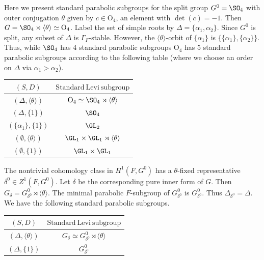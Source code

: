 \documentclass[11pt,letterpaper]{amsart}
\numberwithin{equation}{section}
\begin{document}
\begin{example}
Here we present standard parabolic subgroups for the split group $G^0=\SO_4$ with outer conjugation $
    \theta$ given by $c\in \mathrm{O}_4$, an element with $\det(c)=-1.$
    Then $G=\SO_4\rtimes\langle \theta\rangle\simeq \mathrm{O}_4$. 
    Label the set of simple roots by $\Delta=\{\alpha_1,\alpha_2\}$. Since $G^0$ is split, any subset of $\Delta$ is $\Gamma_F$-stable. However, the $\langle \theta\rangle$-orbit of $\{\alpha_1\}$ is $\{\{\alpha_1\},\{\alpha_2\}\}$. Thus, while $\SO_4$ has 4 standard parabolic subgroups $\mathrm{O}_4$ has 5 standard parabolic subgroups according to the following table (where we choose an order on $\Delta$ via $\alpha_1>\alpha_2$).
\begin{center}
    \begin{tabular}{|c|c|}
    \hline
  $({S}, D)$  & $\mathrm{Standard \ Levi \ subgroup}$  \\
    \hline $(\Delta, \langle \theta \rangle)$    &  $\mathrm{O}_4\simeq \SO_4\rtimes \langle \theta \rangle$ \\
    \hline $(\Delta, \{1\})$    & $\SO_4$   \\
    \hline $(\{\alpha_1\}, \{1\})$    & $\GL_2$ \\
    \hline $(\emptyset,\langle \theta \rangle)$    & $\GL_1\times\GL_1\rtimes\langle \theta \rangle$ \\
    \hline $(\emptyset, \{1\})$    & $\GL_1\times\GL_1$ \\
    \hline
    \end{tabular}
    \end{center}
The nontrivial cohomology class in $H^1(F,G^0)$ has a $\theta$-fixed representative $\delta^0 \in Z^1(F,G^0)$. Let $\delta$ be the corresponding pure inner form of $G$. Then $G_\delta= G^0_{\delta^0} \rtimes \langle \theta \rangle$. The minimal parabolic $F$-subgroup of $G^0_{\delta^0}$ is $G^0_{\delta^0}$. Thus $\Delta_{\delta^0}=\Delta$. We have the following standard parabolic subgroups.
\begin{center}
    \begin{tabular}{|c|c|}
    \hline
  $({S}, D)$  & $\mathrm{Standard \ Levi \ subgroup}$  \\
    \hline $(\Delta, \langle \theta \rangle)$    &  $G_\delta\simeq G^0_{\delta^0}\rtimes \langle \theta \rangle$ \\
    \hline $(\Delta, \{1\})$    & $G^0_{\delta^0}$   \\
    \hline 
    \end{tabular}
    \end{center}
\end{example}
\end{document}

